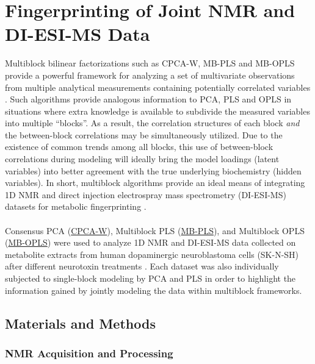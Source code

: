 \section{Fingerprinting of Joint \hnmr{} NMR and DI-ESI-MS Data}

\begin{doublespace}
Multiblock bilinear factorizations such as CPCA-W, MB-PLS and MB-OPLS provide
a powerful framework for analyzing a set of multivariate observations from
multiple analytical measurements containing potentially correlated variables
\cite{westerhuis:jchemo1997,westerhuis:jchemo1998,smilde:jchemo2003}. Such
algorithms provide analogous information to PCA, PLS and OPLS in situations
where extra knowledge is available to subdivide the measured variables into
multiple ``blocks''. As a result, the correlation structures of each block
\emph{and} the between-block correlations may be simultaneously utilized.
Due to the existence of common trends among all blocks, this use of
between-block correlations during modeling will ideally bring the model
loadings (latent variables) into better agreement with the true underlying
biochemistry (hidden variables). In short, multiblock algorithms provide an
ideal means of integrating 1D \hnmr{} NMR and direct injection electrospray
mass spectrometry (DI-ESI-MS) datasets for metabolic fingerprinting
\cite{xu:abc2013}.
\\\\
Consensus PCA (\hyperlink{subsection.3.5.4}{CPCA-W}),
Multiblock PLS (\hyperlink{subsection.3.5.5}{MB-PLS}), and
Multiblock OPLS (\hyperlink{subsection.3.5.6}{MB-OPLS}) were used to analyze
1D \hnmr{} NMR and DI-ESI-MS data collected on metabolite extracts from
human dopaminergic neuroblastoma cells (SK-N-SH) after different neurotoxin
treatments \cite{marshall:metab2015}. Each dataset was also individually
subjected to single-block modeling by PCA and PLS in order to highlight the
information gained by jointly modeling the data within multiblock frameworks.
\end{doublespace}

\subsection{Materials and Methods}

\subsubsection{NMR Acquisition and Processing}

